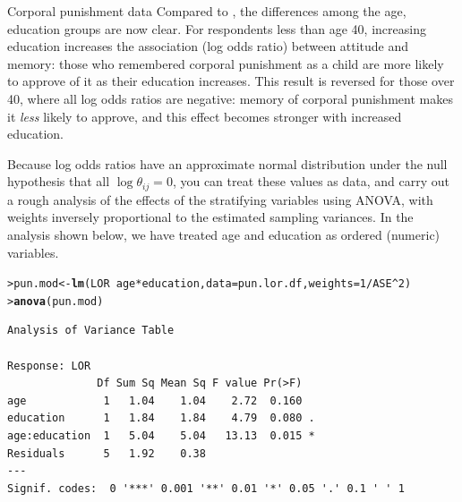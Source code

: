 \documentclass[10pt,krantz2]{krantz}\usepackage[]{graphicx}\usepackage[]{color}
\makeatletter
\newcommand{\hlnum}[1]{\textcolor[rgb]{0.686,0.059,0.569}{#1}}%
\newcommand{\hlopt}[1]{\textcolor[rgb]{0,0,0}{#1}}%
\newcommand{\hlstd}[1]{\textcolor[rgb]{0.345,0.345,0.345}{#1}}%
\newcommand{\hlkwb}[1]{\textcolor[rgb]{0.69,0.353,0.396}{#1}}%
\newcommand{\hlkwc}[1]{\textcolor[rgb]{0.333,0.667,0.333}{#1}}%
\newcommand{\hlkwd}[1]{\textcolor[rgb]{0.737,0.353,0.396}{\textbf{#1}}}%
\newenvironment{kframe}{%
 \def\at@end@of@kframe{}%
 \ifinner\ifhmode%
  \def\at@end@of@kframe{\end{minipage}}%
  \begin{minipage}{\columnwidth}%
 \fi\fi%
 \def\FrameCommand##1{\hskip\@totalleftmargin \hskip-\fboxsep
 \colorbox{shadecolor}{##1}\hskip-\fboxsep
     \hskip-\linewidth \hskip-\@totalleftmargin \hskip\columnwidth}%
 \MakeFramed {\advance\hsize-\width
   \@totalleftmargin\z@ \linewidth\hsize
   \@setminipage}}%
 {\par\unskip\endMakeFramed%
 \at@end@of@kframe}
\newenvironment{knitrout}{}{} %
\renewenvironment{knitrout}{\small\renewcommand{\baselinestretch}{.85}}{} %
\makeatother
\begin{document}
\begin{Example}[punish2]{Corporal punishment data}
\begin{knitrout}
\end{knitrout}
Compared to , the differences among the age, education groups are now clear.
For respondents less than age 40, increasing education increases the association (log odds ratio) 
between attitude and memory: those who remembered corporal punishment as a child are more likely to
approve of it as their education increases.  This result is reversed for those over 40, where all
log odds ratios are negative: memory of corporal punishment makes it \emph{less} likely to approve,
and this effect becomes stronger with increased education.

Because log odds ratios have an approximate normal distribution under the null hypothesis that
all $\log \theta_{ij} =0$, you can treat these values as data, and carry out a rough analysis
of the effects of the stratifying variables using ANOVA, with weights inversely proportional to the
estimated sampling variances. In the analysis shown below, we have treated age and education as
ordered (numeric) variables.


\begin{knitrout}
\color{fgcolor}\begin{kframe}
\begin{alltt}
\hlstd{> }\hlstd{pun.mod} \hlkwb{<-} \hlkwd{lm}\hlstd{(LOR} \hlopt{~} \hlstd{age} \hlopt{*} \hlstd{education,} \hlkwc{data}\hlstd{=pun.lor.df,} \hlkwc{weights}\hlstd{=}\hlnum{1}\hlopt{/}\hlstd{ASE}\hlopt{^}\hlnum{2}\hlstd{)}
\hlstd{> }\hlkwd{anova}\hlstd{(pun.mod)}
\end{alltt}
\begin{verbatim}
Analysis of Variance Table

Response: LOR
              Df Sum Sq Mean Sq F value Pr(>F)  
age            1   1.04    1.04    2.72  0.160  
education      1   1.84    1.84    4.79  0.080 .
age:education  1   5.04    5.04   13.13  0.015 *
Residuals      5   1.92    0.38                 
---
Signif. codes:  0 '***' 0.001 '**' 0.01 '*' 0.05 '.' 0.1 ' ' 1
\end{verbatim}
\end{kframe}
\end{knitrout}
\end{Example}
\end{document}
